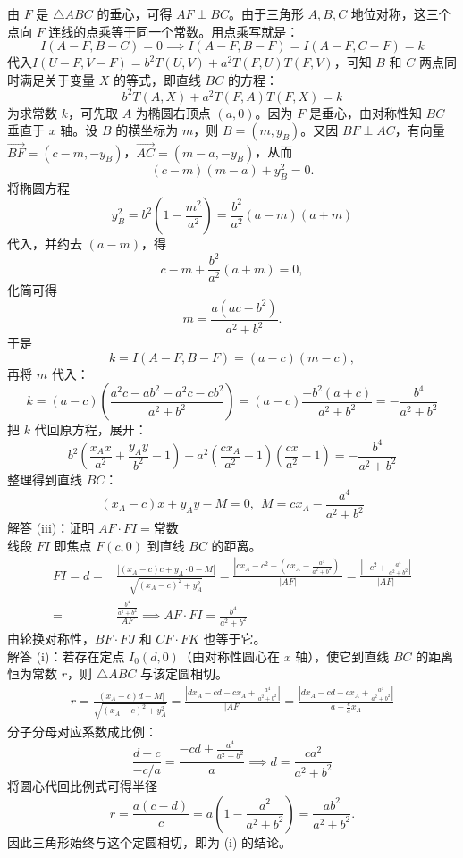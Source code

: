\begin{solution}
由 $F$ 是 $\triangle ABC$ 的垂心，可得 $AF \perp BC$。由于三角形 $A, B, C$ 地位对称，这三个点向 $F$ 连线的点乘等于同一个常数。用点乘写就是：
\[I(A-F, B-C) = 0 \implies I(A-F, B-F) = I(A-F, C-F) = k\]
代入$I(U-F, V-F) = b^2 T(U,V) + a^2 T(F,U) T(F,V)$，可知 $B$ 和 $C$ 两点同时满足关于变量 $X$ 的等式，即直线 $BC$ 的方程：
$$ b^2 T(A,X) + a^2 T(F,A) T(F,X) = k $$
为求常数 $k$，可先取 $A$ 为椭圆右顶点 $(a,0)$。因为 $F$ 是垂心，由对称性知 $BC$ 垂直于 $x$ 轴。设 $B$ 的横坐标为 $m$，则 $B=(m, y_B)$。又因 $BF \perp AC$，有向量 $\overrightarrow{BF} = (c-m, -y_B)$，$\overrightarrow{AC} = (m-a, -y_B)$，从而
$$(c-m)(m-a) + y_B^2 = 0.$$
将椭圆方程
$$y_B^2 = b^2\left(1 - \frac{m^2}{a^2}\right) = \frac{b^2}{a^2}(a-m)(a+m)$$
代入，并约去 $(a-m)$，得
$$c-m + \frac{b^2}{a^2}(a+m) = 0,$$
化简可得
$$m = \frac{a(ac-b^2)}{a^2+b^2}.$$
于是
$$k = I(A-F, B-F) = (a-c)(m-c),$$
再将 $m$ 代入：
\[k = (a-c) \left( \frac{a^2 c - a b^2 - a^2 c - c b^2}{a^2+b^2} \right) = (a-c) \frac{-b^2(a+c)}{a^2+b^2} = -\frac{b^4}{a^2+b^2}\]
把 $k$ 代回原方程，展开：
\[b^2(\frac{x_A x}{a^2} + \frac{y_A y}{b^2} - 1) + a^2(\frac{cx_A}{a^2} - 1)(\frac{cx}{a^2} - 1) = -\frac{b^4}{a^2+b^2}\]
整理得到直线 $BC$： \[(x_A - c)x + y_A y - M = 0,~~\boxed{M = cx_A - \frac{a^4}{a^2+b^2}}\]
解答 (iii)：证明 $AF\cdot FI = \text{常数}$\\
线段 $FI$ 即焦点 $F(c,0)$ 到直线 $BC$ 的距离。
\begin{align*}
FI=d=&\frac{|(x_A - c)c + y_A \cdot 0 - M|}{\sqrt{(x_A - c)^2 + y_A^2}}=\frac{|c x_A - c^2 - \left(cx_A - \frac{a^4}{a^2+b^2}\right)|}{|AF|}=\frac{|-c^2 + \frac{a^4}{a^2+b^2}|}{|AF|}\\
=& \frac{\frac{b^4}{a^2+b^2}}{AF} \implies AF \cdot FI = \frac{b^4}{a^2+b^2}
\end{align*}
由轮换对称性，$BF \cdot FJ$ 和 $CF \cdot FK$ 也等于它。\\
解答 (i)：若存在定点 $I_0(d,0)$（由对称性圆心在 $x$ 轴），使它到直线 $BC$ 的距离恒为常数 $r$，则 $\triangle ABC$ 与该定圆相切。
\begin{align*}
r=\frac{|(x_A - c)d - M|}{\sqrt{(x_A - c)^2 + y_A^2}}=\frac{ |d x_A - cd - cx_A + \frac{a^4}{a^2+b^2}|}{|AF|}=\frac{ |d x_A - cd - cx_A + \frac{a^4}{a^2+b^2}|}{a - \frac{c}{a}x_A}
\end{align*}
分子分母对应系数成比例：
$$ \frac{d - c}{-c/a} = \frac{-cd + \frac{a^4}{a^2+b^2}}{a} \implies d = \frac{c a^2}{a^2+b^2}$$
将圆心代回比例式可得半径
$$r = \frac{a(c - d)}{c} = a\left(1 - \frac{a^2}{a^2+b^2}\right) = {\frac{a b^2}{a^2+b^2}}.$$
因此三角形始终与这个定圆相切，即为 (i) 的结论。\\

\end{solution}
